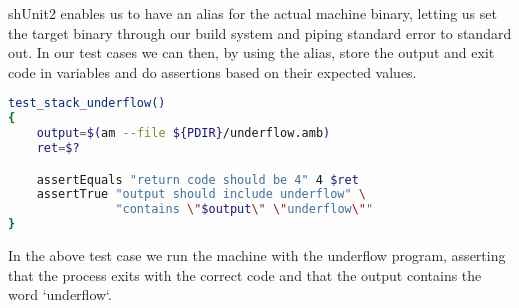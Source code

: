 shUnit2 enables us to have an alias for the actual machine binary, letting us
set the target binary through our build system and piping standard error to
standard out. In our test cases we can then, by using the alias, store the
output and exit code in variables and do assertions based on their expected
values.
\begin{lstlisting}[language={sh},caption={shUnit2 underflow test case}]
test_stack_underflow()
{
    output=$(am --file ${PDIR}/underflow.amb)
    ret=$?

    assertEquals "return code should be 4" 4 $ret
    assertTrue "output should include underflow" \
               "contains \"$output\" \"underflow\""
}
\end{lstlisting}

In the above test case we run the machine with the underflow program, asserting
that the process exits with the correct code and that the output contains the
word `underflow`.
